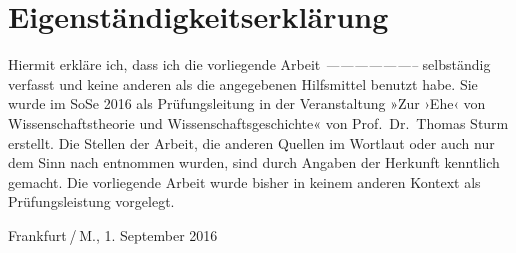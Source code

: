 \documentclass[ngerman,12pt, titlepage, smallheadings, nomath]{scrartcl}
\begin{document}
\indent
\vspace{-2em} \begingroup
\setlength{\parindent}{-0.2in} \setlength{\leftskip}{0.2in}
\setlength{\parskip}{8pt} \singlespacing

\printbibliography

\endgroup
\newpage

\section*{Eigenständigkeitserklärung}\label{eigenstuxe4ndigkeitserkluxe4rung}

Hiermit erkläre ich, dass ich die vorliegende Arbeit
\emph{--------------------} selbständig verfasst und keine anderen als
die angegebenen Hilfsmittel benutzt habe. Sie wurde im SoSe 2016 als
Prüfungsleitung in der Veranstaltung »Zur ›Ehe‹ von Wissenschaftstheorie
und Wissenschaftsgeschichte« von Prof.~Dr.~Thomas Sturm erstellt. Die
Stellen der Arbeit, die anderen Quellen im Wortlaut oder auch nur dem
Sinn nach entnommen wurden, sind durch Angaben der Herkunft kenntlich
gemacht. Die vorliegende Arbeit wurde bisher in keinem anderen Kontext
als Prüfungsleistung vorgelegt. \vspace{3em}

\noindent Frankfurt / M., 1. September 2016
\end{document}
